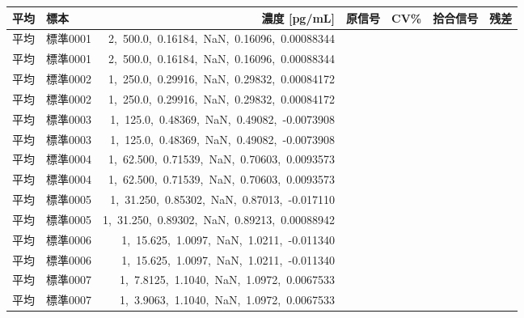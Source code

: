 \documentclass[UTF8,10pt,a4paper,fontset=fandol]{ctexart}
\newcommand{\fieldvalue}[1]{#1}
\begin{document}
\begin{table}[h]
\small
\centering
\begin{tabularx}{\textwidth}{l l r r r r r}
\textbf{平均} & \textbf{標本} & \textbf{濃度 [pg/mL]} &
\textbf{原信号} & \textbf{CV\%} & \textbf{拾合信号} & \textbf{残差} \\
\hline
平均 & 標準0001 & 
\fieldvalue{2,\ 500.0,\ 0.16184,\ NaN,\ 0.16096,\ 0.00088344} \\
平均 & 標準0001 & 
\fieldvalue{2,\ 500.0,\ 0.16184,\ NaN,\ 0.16096,\ 0.00088344} \\
平均 & 標準0002 & 
\fieldvalue{1,\ 250.0,\ 0.29916,\ NaN,\ 0.29832,\ 0.00084172} \\
平均 & 標準0002 & 
\fieldvalue{1,\ 250.0,\ 0.29916,\ NaN,\ 0.29832,\ 0.00084172} \\
平均 & 標準0003 & 
\fieldvalue{1,\ 125.0,\ 0.48369,\ NaN,\ 0.49082,\ -0.0073908} \\
平均 & 標準0003 & 
\fieldvalue{1,\ 125.0,\ 0.48369,\ NaN,\ 0.49082,\ -0.0073908} \\
平均 & 標準0004 & 
\fieldvalue{1,\ 62.500,\ 0.71539,\ NaN,\ 0.70603,\ 0.0093573} \\
平均 & 標準0004 & 
\fieldvalue{1,\ 62.500,\ 0.71539,\ NaN,\ 0.70603,\ 0.0093573} \\
平均 & 標準0005 & 
\fieldvalue{1,\ 31.250,\ 0.85302,\ NaN,\ 0.87013,\ -0.017110} \\
平均 & 標準0005 & 
\fieldvalue{1,\ 31.250,\ 0.89302,\ NaN,\ 0.89213,\ 0.00088942} \\
平均 & 標準0006 & 
\fieldvalue{1,\ 15.625,\ 1.0097,\ NaN,\ 1.0211,\ -0.011340} \\
平均 & 標準0006 & 
\fieldvalue{1,\ 15.625,\ 1.0097,\ NaN,\ 1.0211,\ -0.011340} \\
平均 & 標準0007 & 
\fieldvalue{1,\ 7.8125,\ 1.1040,\ NaN,\ 1.0972,\ 0.0067533} \\
平均 & 標準0007 & 
\fieldvalue{1,\ 3.9063,\ 1.1040,\ NaN,\ 1.0972,\ 0.0067533} \\
\end{tabularx}
\end{table}
\end{document}
